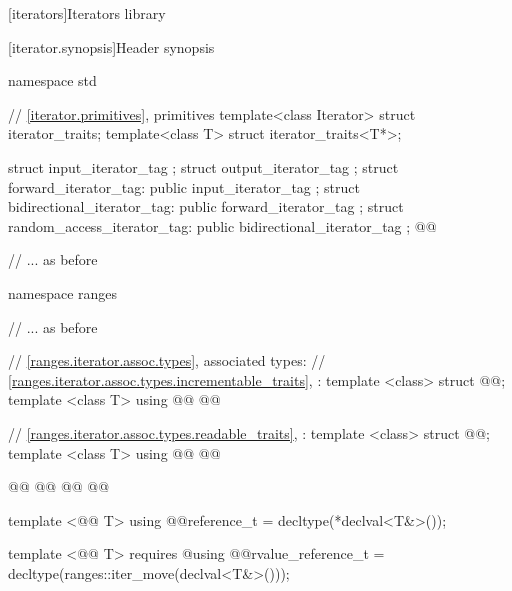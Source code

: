 \setcounter{chapter}{26}
[iterators]{Iterators library}

\setcounter{section}{2}
[iterator.synopsis]{Header  synopsis}

%
\begin{codeblock}
namespace std {
  // \ref{iterator.primitives}, primitives
  template<class Iterator> struct iterator_traits;
  template<class T> struct iterator_traits<T*>;

  struct input_iterator_tag { };
  struct output_iterator_tag { };
  struct forward_iterator_tag: public input_iterator_tag { };
  struct bidirectional_iterator_tag: public forward_iterator_tag { };
  struct random_access_iterator_tag: public bidirectional_iterator_tag { };
  @@

  // ... as before

  namespace ranges {
    // ... as before

    // \ref{ranges.iterator.assoc.types}, associated types:
    // \ref{ranges.iterator.assoc.types.incrementable_traits}, :
    template <class> struct @@;
    template <class T> using @@
      @@

    // \ref{ranges.iterator.assoc.types.readable_traits}, :
    template <class> struct @@;
    template <class T> using @@
      @@

    @@
    @@
    @@
      @@

    template <@@ T> using @@reference_t
      = decltype(*declval<T&>());

    template <@@ T>
        requires @\seebelow@ using @@rvalue_reference_t
      = decltype(ranges::iter_move(declval<T&>()));

}}
\end{codeblock}
